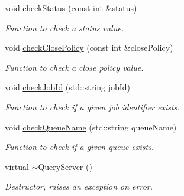 \begin{DoxyCompactItemize}
void \hyperlink{classQueryServer_a358f371f74bcb2dd3e789bd20d0cb672}{checkStatus} (const int \&status)
\begin{DoxyCompactList}\small\item\em Function to check a status value. \item\end{DoxyCompactList}\item 
void \hyperlink{classQueryServer_a73cc37f1e18f4e5028d8f4d68b9b148f}{checkClosePolicy} (const int \&closePolicy)
\begin{DoxyCompactList}\small\item\em Function to check a close policy value. \item\end{DoxyCompactList}\item 
void \hyperlink{classQueryServer_add7b3dc1799367f27cf0160a5ac63ecf}{checkJobId} (std::string jobId)
\begin{DoxyCompactList}\small\item\em Function to check if a given job identifier exists. \item\end{DoxyCompactList}\item 
void \hyperlink{classQueryServer_ad0f0f43c901920be7fb7a3719bb782ba}{checkQueueName} (std::string queueName)
\begin{DoxyCompactList}\small\item\em Function to check if a given queue exists. \item\end{DoxyCompactList}\item 
\hypertarget{classQueryServer_a5e207567c6ce02000e949e277b54e2d3}{
virtual \hyperlink{classQueryServer_a5e207567c6ce02000e949e277b54e2d3}{$\sim$QueryServer} ()}
\label{classQueryServer_a5e207567c6ce02000e949e277b54e2d3}

\begin{DoxyCompactList}\small\item\em Destructor, raises an exception on error. \item\end{DoxyCompactList}\end{DoxyCompactItemize}
